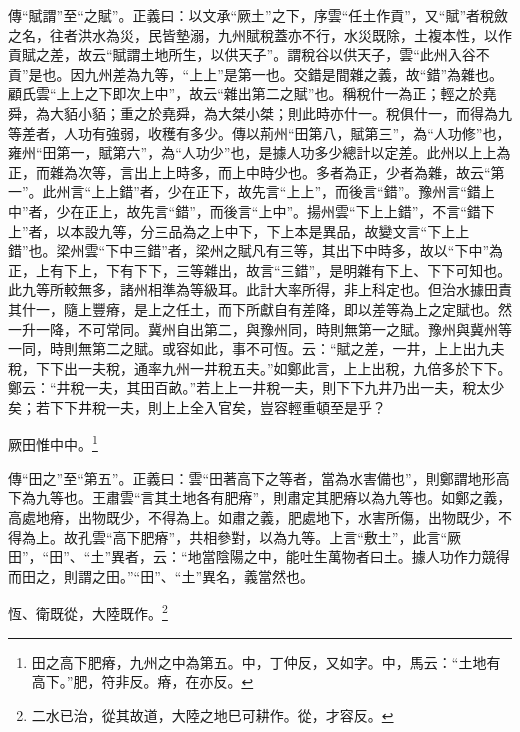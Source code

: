 {\noindent\zhuan{}\fzbyks 傳“賦謂”至“之賦”。正義曰：以文承“厥土”之下，序雲“任土作貢”，又“賦”者稅斂之名，往者洪水為災，民皆墊溺，九州賦稅蓋亦不行，水災既除，土複本性，以作貢賦之差，故云“賦謂土地所生，以供天子”。謂稅谷以供天子，雲“此州入谷不貢”是也。因九州差為九等，“上上”是第一也。交錯是間雜之義，故“錯”為雜也。顧氏雲“上上之下即次上中”，故云“雜出第二之賦”也。稱稅什一為正；輕之於堯舜，為大貊小貊；重之於堯舜，為大桀小桀；則此時亦什一。稅俱什一，而得為九等差者，人功有強弱，收穫有多少。傳以荊州“田第八，賦第三”，為“人功修”也，雍州“田第一，賦第六”，為“人功少”也，是據人功多少總計以定差。此州以上上為正，而雜為次等，言出上上時多，而上中時少也。多者為正，少者為雜，故云“第一”。此州言“上上錯”者，少在正下，故先言“上上”，而後言“錯”。豫州言“錯上中”者，少在正上，故先言“錯”，而後言“上中”。揚州雲“下上上錯”，不言“錯下上”者，以本設九等，分三品為之上中下，下上本是異品，故變文言“下上上錯”也。梁州雲“下中三錯”者，梁州之賦凡有三等，其出下中時多，故以“下中”為正，上有下上，下有下下，三等雜出，故言“三錯”，是明雜有下上、下下可知也。此九等所較無多，諸州相準為等級耳。此計大率所得，非上科定也。但治水據田責其什一，隨上豐瘠，是上之任土，而下所獻自有差降，即以差等為上之定賦也。然一升一降，不可常同。冀州自出第二，與豫州同，時則無第一之賦。豫州與冀州等一同，時則無第二之賦。或容如此，事不可恆。云：“賦之差，一井，上上出九夫稅，下下出一夫稅，通率九州一井稅五夫。”如鄭此言，上上出稅，九倍多於下下。鄭云：“井稅一夫，其田百畝。”若上上一井稅一夫，則下下九井乃出一夫，稅太少矣；若下下井稅一夫，則上上全入官矣，豈容輕重頓至是乎？ \par}

厥田惟中中。\footnote{田之高下肥瘠，九州之中為第五。中，丁仲反，又如字。中，馬云：“土地有高下。”肥，符非反。瘠，在亦反。}

{\noindent\zhuan{}\fzbyks 傳“田之”至“第五”。正義曰：雲“田著高下之等者，當為水害備也”，則鄭謂地形高下為九等也。王肅雲“言其土地各有肥瘠”，則肅定其肥瘠以為九等也。如鄭之義，高處地瘠，出物既少，不得為上。如肅之義，肥處地下，水害所傷，出物既少，不得為上。故孔雲“高下肥瘠”，共相參對，以為九等。上言“敷土”，此言“厥田”，“田”、“土”異者，云：“地當陰陽之中，能吐生萬物者曰土。據人功作力競得而田之，則謂之田。”“田”、“土”異名，義當然也。 \par}

恆、衛既從，大陸既作。\footnote{二水已治，從其故道，大陸之地巳可耕作。從，才容反。}

